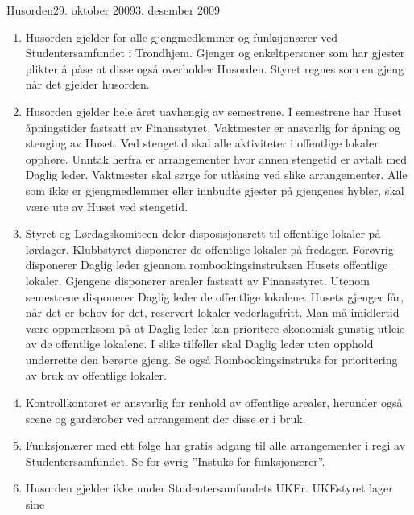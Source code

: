 \begin{instruks}{Husorden}{29. oktober 2009}{3. desember 2009}
    \begin{enumerate}
        \item Husorden gjelder for alle gjengmedlemmer og funksjonærer ved
            Studentersamfundet i Trondhjem.
            Gjenger og enkeltpersoner som har gjester plikter å påse at disse også
            overholder Husorden. Styret regnes
            som en gjeng når det gjelder husorden.
        \item Husorden gjelder hele året uavhengig av semestrene. I semestrene har Huset
            åpningstider fastsatt av
            Finansstyret. Vaktmester er ansvarlig for åpning og stenging av Huset. Ved
            stengetid skal alle aktiviteter i
            offentlige lokaler opphøre. Unntak herfra er arrangementer hvor annen
            stengetid er avtalt med Daglig
            leder. Vaktmester skal sørge for utlåsing ved slike arrangementer. Alle som
            ikke er gjengmedlemmer eller
            innbudte gjester på gjengenes hybler, skal være ute av Huset ved stengetid.
           \item Styret og Lørdagskomiteen deler disposisjonsrett til offentlige lokaler på
            lørdager. Klubbstyret disponerer
            de offentlige lokaler på fredager. Forøvrig disponerer Daglig leder gjennom
            rombookingsinstruksen
            Husets offentlige lokaler. Gjengene disponerer arealer fastsatt av
            Finansstyret. Utenom semestrene
            disponerer Daglig leder de offentlige lokalene. Husets gjenger får, når det er
            behov for det, reservert
            lokaler vederlagsfritt. Man må imidlertid være oppmerksom på at Daglig leder
            kan prioritere økonomisk
            gunstig utleie av de offentlige lokalene. I slike tilfeller skal Daglig leder
            uten opphold underrette den
            berørte gjeng. Se også Rombookingsinstruks for prioritering av bruk av
            offentlige lokaler.
        \item Kontrollkontoret er ansvarlig for renhold av offentlige arealer, herunder også
            scene og garderober ved
            arrangement der disse er i bruk.
        \item Funksjonærer med ett følge har gratis adgang til alle arrangementer i regi av
            Studentersamfundet. Se for
            øvrig ”Instuks for funksjonærer”.
        \item Husorden gjelder ikke under Studentersamfundets UKEr. UKEstyret lager sine

\end{enumerate}
\end{instruks}
